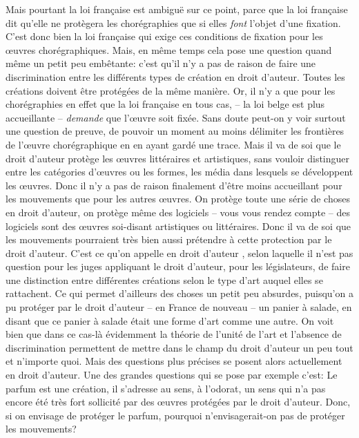 {Mais pourtant la loi fran\c{c}aise est ambigu\"e sur ce point,
parce que la loi fran\c{c}aise dit qu'elle ne prot\`egera les
chor\'egraphies que si elles {\em font} l'objet d'une fixation.
C'est donc bien la loi fran\c{c}aise qui exige ces conditions de
fixation pour les {\oe}uvres chor\'egraphiques. Mais, en m\^eme temps
cela pose une question quand m\^eme un petit peu emb\^etante:
c'est qu'il n'y a pas de raison de faire une
discrimination entre les diff\'erents types de cr\'eation en droit
d'auteur. Toutes les cr\'eations doivent \^etre prot\'eg\'ees de la
m\^eme mani\`ere. Or, il n'y a que pour les chor\'egraphies en effet
que la loi fran\c{c}aise en tous cas, {--} la loi belge est plus
accueillante {--} {\em demande} que l'{\oe}uvre soit fix\'ee. Sans
doute peut{}-on y voir surtout une question de preuve, de pouvoir un
moment au moins d\'elimiter les fronti\`eres de l'{\oe}uvre
chor\'egraphique en en ayant gard\'e une trace. Mais il va de soi que
le droit d'auteur prot\`ege les {\oe}uvres litt\'eraires et
artistiques, sans vouloir distinguer entre les cat\'egories
d'{\oe}uvres ou les formes, les m\'edia dans lesquels se d\'eveloppent
les {\oe}uvres. Donc il n'y a pas de raison finalement d'\^etre moins
accueillant pour les mouvements que pour les autres {\oe}uvres. On
prot\`ege toute une s\'erie de choses en droit d'auteur, on prot\`ege
m\^eme des logiciels {--} vous vous rendez compte {--} des logiciels
sont des {\oe}uvres soi{}-disant artistiques ou litt\'eraires. Donc il
va de soi que les mouvements pourraient tr\`es bien aussi pr\'etendre
\`a cette protection par le droit d'auteur. C'est ce qu'on appelle en
droit d'auteur , selon laquelle il
n'est pas question pour les juges appliquant le droit d'auteur, pour
les l\'egislateurs, de faire une distinction entre diff\'erentes
cr\'eations selon le type d'art auquel elles se rattachent. Ce qui
permet d'ailleurs des choses un petit peu absurdes, puisqu'on a pu
prot\'eger par le droit d'auteur {--} en France de nouveau {--} un
panier \`a salade, en disant que ce panier \`a salade \'etait une forme
d'art comme une autre. On voit bien que dans ce cas{}-l\`a \'evidemment
la th\'eorie de l'unit\'e de l'art et l'absence de discrimination
permettent de mettre dans le champ du droit d'auteur
un peu tout et n'importe quoi. Mais des questions plus pr\'ecises se
posent alors actuellement en droit d'auteur. Une des grandes questions
qui se pose par exemple c'est:  Le parfum est une cr\'eation, il s'adresse au sens,
\`a l'odorat, un sens qui n'a pas encore \'et\'e tr\`es fort
sollicit\'e par des {\oe}uvres prot\'eg\'ees par le droit d'auteur.
Donc, si on envisage de prot\'eger le parfum, pourquoi
n'envisagerait{}-on pas de prot\'eger les mouvements?\par

}
